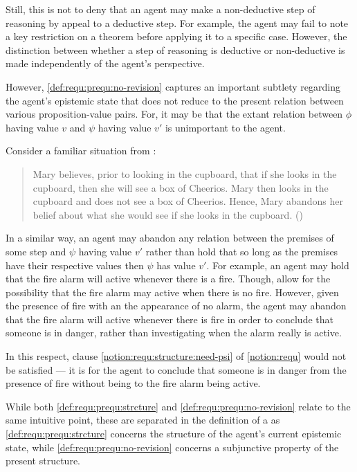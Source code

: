 \begin{note}[Weaker]
{    Still, this is not to deny that an agent may make a non-deductive step of reasoning by appeal to a deductive step.
    For example, the agent may fail to note a key restriction on a theorem before applying it to a specific case.
    However, the distinction between whether a step of reasoning is deductive or non-deductive is made independently of the agent's perspective.
  }
\end{note}

\begin{note}[\ref{def:requ:prequ:no-revision}]
  However, \ref{def:requ:prequ:no-revision} captures an important subtlety regarding the agent's epistemic state that does not reduce to the present relation between various proposition-value pairs.
  For, it may be that the extant relation between \(\phi\) having value \(v\) and \(\psi\) having value \(v'\) is unimportant to the agent.

  Consider a familiar situation from \citeauthor{Harman:1986ux}:

  \begin{quote}
    Mary believes, prior to looking in the cupboard, that if she looks in the cupboard, then she will see a box of Cheerios.
    Mary then looks in the cupboard and does not see a box of Cheerios.
    Hence, Mary abandons her belief about what she would see if she looks in the cupboard.\nolinebreak
    \mbox{}\hfill\mbox{(\citeyear[Cf.][Chs.1\&2]{Harman:1986ux})}
  \end{quote}

  In a similar way, an agent may abandon any relation between the premises of some step and \(\psi\) having value \(v'\) rather than hold that so long as the premises have their respective values then \(\psi\) has value \(v'\).
  For example, an agent may hold that the fire alarm will active whenever there is a fire.
  Though, allow for the possibility that the fire alarm may active when there is no fire.
  However, given the presence of fire with an the appearance of no alarm, the agent may abandon that the fire alarm will active whenever there is fire in order to conclude that someone is in danger, rather than investigating when the alarm really is active.

  In this respect, clause \ref{notion:requ:structure:need-psi} of \autoref{notion:requ} would not be satisfied --- it is \epVAd{} for the agent to conclude that someone is in danger from the presence of fire without being \committed{} to the fire alarm being active.

  While both \ref{def:requ:prequ:strcture} and \ref{def:requ:prequ:no-revision} relate to the same intuitive point, these are separated in the definition of a \prequ{} as \ref{def:requ:prequ:strcture} concerns the structure of the agent's current epistemic state, while \ref{def:requ:prequ:no-revision} concerns a subjunctive property of the present structure.
\end{note}

